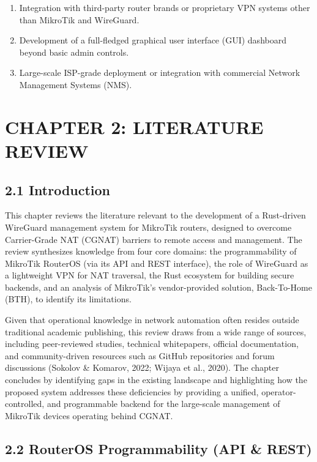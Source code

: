 \documentclass[12pt,a4paper,oneside]{report}
\begin{document}
\begin{enumerate}
  \item Integration with third-party router brands or proprietary VPN systems other than MikroTik and WireGuard.
  \item Development of a full-fledged graphical user interface (GUI) dashboard beyond basic admin controls.
  \item Large-scale ISP-grade deployment or integration with commercial Network Management Systems (NMS).
\end{enumerate}

\chapter{CHAPTER 2: LITERATURE REVIEW}

\section{2.1 Introduction}

This chapter reviews the literature relevant to the development of a Rust-driven WireGuard management system for MikroTik routers, designed to overcome Carrier-Grade NAT (CGNAT) barriers to remote access and management. The review synthesizes knowledge from four core domains: the programmability of MikroTik RouterOS (via its API and REST interface), the role of WireGuard as a lightweight VPN for NAT traversal, the Rust ecosystem for building secure backends, and an analysis of MikroTik's vendor-provided solution, Back-To-Home (BTH), to identify its limitations.

Given that operational knowledge in network automation often resides outside traditional academic publishing, this review draws from a wide range of sources, including peer-reviewed studies, technical whitepapers, official documentation, and community-driven resources such as GitHub repositories and forum discussions (Sokolov \& Komarov, 2022; Wijaya et al., 2020). The chapter concludes by identifying gaps in the existing landscape and highlighting how the proposed system addresses these deficiencies by providing a unified, operator-controlled, and programmable backend for the large-scale management of MikroTik devices operating behind CGNAT.

\section{2.2 RouterOS Programmability (API \& REST)}
\end{document}

